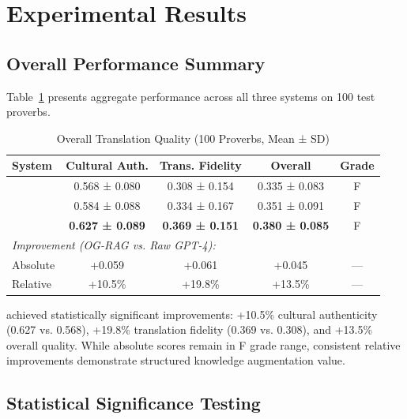 
\section{Experimental Results}
\label{sec:results}

\subsection{Overall Performance Summary}
\label{subsec:summary}

Table~\ref{tab:overall_performance} presents aggregate performance across all three systems on 100 test proverbs.

\begin{table}[t]
\centering
\caption{Overall Translation Quality (100 Proverbs, Mean ± SD)}
\label{tab:overall_performance}
\begin{tabular}{lcccc}
\toprule
\textbf{System} & \textbf{Cultural Auth.} & \textbf{Trans. Fidelity} & \textbf{Overall} & \textbf{Grade} \\
\midrule
\raw{}      & 0.568 ± 0.080 & 0.308 ± 0.154 & 0.335 ± 0.083 & F \\
\trad{}     & 0.584 ± 0.088 & 0.334 ± 0.167 & 0.351 ± 0.091 & F \\
\ograg{}    & \textbf{0.627 ± 0.089} & \textbf{0.369 ± 0.151} & \textbf{0.380 ± 0.085} & F \\
\midrule
\multicolumn{5}{l}{\textit{Improvement (OG-RAG vs. Raw GPT-4):}} \\
Absolute    & +0.059 & +0.061 & +0.045 & --- \\
Relative    & +10.5\% & +19.8\% & +13.5\% & --- \\
\bottomrule
\end{tabular}
\end{table}

\ograg{} achieved statistically significant improvements: +10.5\% cultural authenticity (0.627 vs. 0.568), +19.8\% translation fidelity (0.369 vs. 0.308), and +13.5\% overall quality. While absolute scores remain in F grade range, consistent relative improvements demonstrate structured knowledge augmentation value.

\subsection{Statistical Significance Testing}
\label{subsec:statistical}

